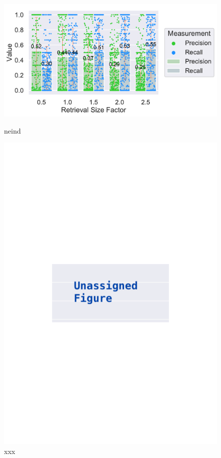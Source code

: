 \documentclass[\myrootdir/main.tex]{subfiles}
\begin{document}
\begin{figure}[htbp]
	\centering
	\begin{minipage}{0.45\textwidth}
		\centering
		\includegraphics[width=\textwidth, clip]{img/big-study/contextsizefactor-precision-recall-TS.pdf}
		\caption{neind}
		\label{fig:contextsizefactor-precision-recall-TS}
	\end{minipage}\hfill
	\begin{minipage}{0.45\textwidth}
		\centering
		\includegraphics[width=\textwidth, clip]{img/big-study/xxx.pdf}
		\caption{xxx}
		\label{fig:xxx}
	\end{minipage}
\end{figure}
\end{document}
